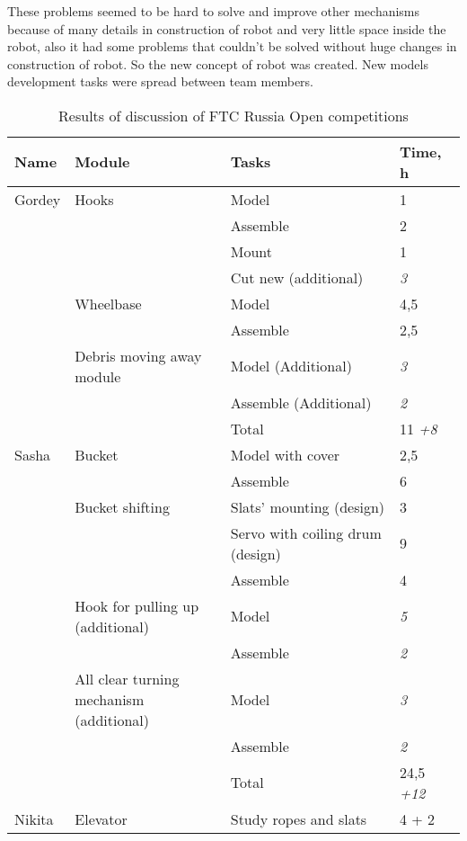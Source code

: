   These problems seemed to be hard to solve and improve other mechanisms because of many details in construction of robot and very little space inside the robot, also it had some problems that couldn't be solved without huge changes in construction of robot. So the new concept of robot was created. New models development tasks were spread between team members.
\begin{table}[H]
  \caption{Results of discussion of FTC Russia Open competitions}
  \label{tabular:PlanRUS28.02}
  \begin{center}
	\begin{tabular}{|p{0.12\linewidth}|p{0.35\linewidth}|p{0.38\linewidth}|p{0.15\linewidth}|}
		\hline
		Name & Module & Tasks & Time, h \\
		\hline
		Gordey	& Hooks	& Model	& 1 \\
		& & Assemble & 2 \\
		& & Mount & 1 \\
		& & Cut new (additional) & \textit{3} \\
		\hline
		& Wheelbase & Model & 4,5 \\
		& & Assemble	& 2,5 \\
		& Debris moving away module	& Model (Additional)	& \textit{3} \\
		& & Assemble (Additional) & \textit{2} \\
		\hline
		& & Total & 11 \textit{+8} \\
		\hline 
		\hline
		Sasha & Bucket	& Model with cover	& 2,5 \\
		& & Assemble & 6 \\
		\hline
		& Bucket shifting & Slats' mounting (design) & 3 \\
		& & Servo with coiling drum (design)	& 9 \\   
		& & Assemble	& 4 \\                                
		\hline
		& Hook for pulling up (additional)	& Model	& \textit{5} \\              
		& & Assemble	& \textit{2}\\          
		& All clear turning mechanism (additional) & Model & \textit{3}\\       
		& & Assemble	& \textit{2} \\
		\hline                                
		& & Total	& 24,5 \textit{+12}\\                        
		\hline
		\hline                                            
		Nikita	& Elevator	& Study ropes and slats	& 4 + 2 \\        

\end{tabular}
\end{center}
\end{table}
